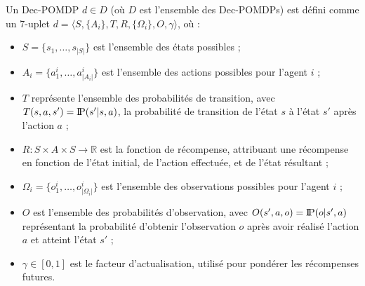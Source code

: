 \documentclass[pdflatex,sn-mathphys-num]{sn-jnl}%
\newcommand{\probP}{\text{I\kern-0.15em P}}
\theoremstyle{thmstyleone}%
\theoremstyle{thmstyletwo}%
\theoremstyle{thmstylethree}%
\begin{document}
Un Dec-POMDP $d \in D$ (où $D$ est l'ensemble des Dec-POMDPs) est défini comme un 7-uplet $d = \langle S, \{A_i\}, T, R, \{\Omega_i\}, O, \gamma \rangle$, où :
\begin{itemize}
    \item $S = \{s_1,\dots,s_{|S|}\}$ est l'ensemble des états possibles ;
    \item $A_{i} = \{a_{1}^{i},\dots,a_{|A_{i}|}^{i}\}$ est l'ensemble des actions possibles pour l'agent $i$ ;
    \item $T$ représente l'ensemble des probabilités de transition, avec $T(s,a,s') = \probP(s'|s,a)$, la probabilité de transition de l'état $s$ à l'état $s'$ après l'action $a$ ;
    \item $R: S \times A \times S \rightarrow \mathbb{R}$ est la fonction de récompense, attribuant une récompense en fonction de l'état initial, de l'action effectuée, et de l'état résultant ;
    \item $\Omega_{i} = \{o_{1}^{i},\dots,o_{|\Omega_{i}|}^{i}\}$ est l'ensemble des observations possibles pour l'agent $i$ ;
    \item $O$ est l'ensemble des probabilités d'observation, avec $O(s',a,o) = \probP(o|s',a)$ représentant la probabilité d'obtenir l'observation $o$ après avoir réalisé l'action $a$ et atteint l'état $s'$ ;
    \item $\gamma \in [0,1]$ est le facteur d'actualisation, utilisé pour pondérer les récompenses futures.
\end{itemize}
\end{document}
